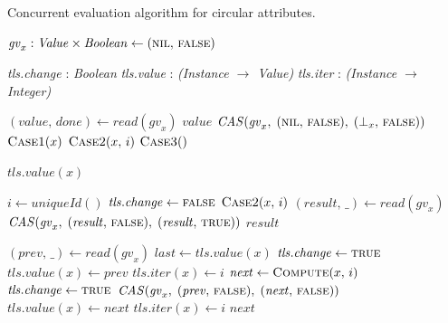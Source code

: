{\begin{algorithm*}
  \caption{Concurrent evaluation algorithm for circular attributes.}
  \label{alg:circular}
  \begin{algorithmic}

  \State $\mathit{gv}_x : \mathit{Value} \times \mathit{Boolean} \leftarrow (\textsc{nil},\,\textsc{false})$
  \State

  \State \emph{tls.change} : \emph{Boolean}
  \State \emph{tls.value} : \emph{(Instance \(\rightarrow\) Value)}
  \State \emph{tls.iter} : \emph{(Instance \(\rightarrow\) Integer)}
  \State

    \State $(\mathit{value},\,\mathit{done}) \leftarrow read(\mathit{gv}_x)$
      \State \Return $\mathit{value}$
      \State $\mathit{CAS}(\mathit{gv}_x,\;(\textsc{nil},\,\textsc{false}),\;(\bot_x,\,\textsc{false}))$
    \EndIf
      \State \Return $\textsc{Case1}(x)$
      \State \Return $\textsc{Case2}(x,\,i)$
    \Else
      \State \Return $\textsc{Case3}()$
    \EndIf
  \EndProcedure

  \State
    \State \Return $\mathit{tls}.\mathit{value}(x)$
  \EndProcedure
  \end{algorithmic}
\end{algorithm*}
\begin{algorithm*}
  \begin{algorithmic}
    \Repeat
      \State $i \leftarrow \mathit{uniqueId}()$
      \State $\mathit{tls}.\mathit{change} \leftarrow \textsc{false}$
      \State $\textsc{Case2}(x,\,i)$
    \State $(\mathit{result},\,\_) \leftarrow read(\mathit{gv}_x)$
    \State $\mathit{CAS}(\mathit{gv}_x,\;(\mathit{result},\,\textsc{false}),\;(\mathit{result},\,\textsc{true}))$
    \State \Return $result$
  \EndProcedure

  \State
    \State $(\mathit{prev},\,\_) \leftarrow read(\mathit{gv}_x)$
    \State $last \leftarrow \mathit{tls}.\mathit{value}(x)$
      $\mathit{tls}.\mathit{change} \leftarrow \textsc{true}$
    \EndIIf
    \State $\mathit{tls}.\mathit{value}(x) \leftarrow \mathit{prev}$
    \State $\mathit{tls}.\mathit{iter}(x) \leftarrow i$
    \State $\mathit{next} \leftarrow \textsc{Compute}(x,\,i)$
      \State $\mathit{tls}.\mathit{change} \leftarrow \textsc{true}$
      \State $\mathit{CAS}(\mathit{gv}_x,\;(\mathit{prev},\,\textsc{false}),\;(\mathit{next},\,\textsc{false}))$
      \State $\mathit{tls}.\mathit{value}(x) \leftarrow \mathit{next}$
      \State $\mathit{tls}.\mathit{iter}(x) \leftarrow i$
    \EndIf
    \State \Return $\mathit{next}$
  \EndProcedure


\end{algorithmic}
\end{algorithm*}}

